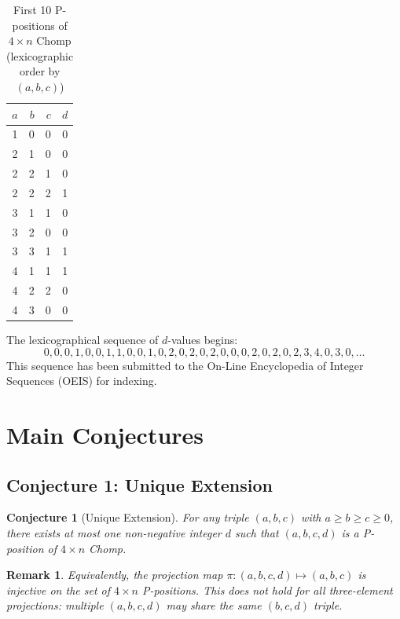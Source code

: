 \documentclass[12pt]{article}
\newtheorem{conjecture}{Conjecture}
\newtheorem{remark}{Remark}
\begin{document}
\begin{table}[h]
\centering
\caption{First 10 P-positions of $4 \times n$ Chomp
         (lexicographic order by $(a,b,c)$)}
\begin{tabular}{rrrr}
\toprule
$a$ & $b$ & $c$ & $d$ \\
\midrule
 1 & 0 & 0 & 0 \\
 2 & 1 & 0 & 0 \\
 2 & 2 & 1 & 0 \\
 2 & 2 & 2 & 1 \\
 3 & 1 & 1 & 0 \\
 3 & 2 & 0 & 0 \\
 3 & 3 & 1 & 1 \\
 4 & 1 & 1 & 1 \\
 4 & 2 & 2 & 0 \\
 4 & 3 & 0 & 0 \\
\bottomrule
\end{tabular}
\label{tab:first10}
\end{table}

The lexicographical sequence of $d$-values begins:
\[
0, 0, 0, 1, 0, 0, 1, 1, 0, 0, 1, 0, 2, 0, 2, 0, 2, 0, 0, 0,
2, 0, 2, 0, 2, 3, 4, 0, 3, 0, \ldots
\]
This sequence has been submitted to the On-Line Encyclopedia of Integer
Sequences (OEIS) for indexing.

\section{Main Conjectures}

\subsection{Conjecture 1: Unique Extension}

\begin{conjecture}[Unique Extension]
\label{conj:unique}
For any triple $(a, b, c)$ with $a \geq b \geq c \geq 0$, there exists
at most one non-negative integer $d$ such that $(a, b, c, d)$ is a
P-position of $4 \times n$ Chomp.
\end{conjecture}

\begin{remark}
Equivalently, the projection map $\pi: (a,b,c,d) \mapsto (a,b,c)$
is injective on the set of $4 \times n$ P-positions. This does not
hold for all three-element projections: multiple $(a,b,c,d)$ may share
the same $(b,c,d)$ triple.
\end{remark}
\end{document}
